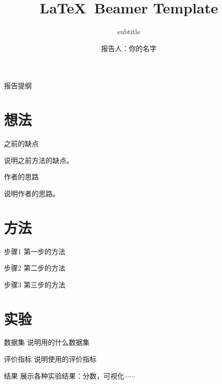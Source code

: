 \documentclass[11pt, aspectratio=169, UTF8, fontset=none]{ctexbeamer}
\title[\LaTeX \ Beamer Template]{\LaTeX \ Beamer Template}
\subtitle{subtitle}
\author[你的名字]{报告人：你的名字}
\institute[你的实验室或学院]{你的大学}
\date{}
\begin{document}
\begin{frame}
    \titlepage
\end{frame}

\begin{frame}{报告提纲}
  \tableofcontents
\end{frame}

\section{想法}

\begin{frame}{之前的缺点}
    
    说明之前方法的缺点。

\end{frame}

\begin{frame}{作者的思路}
    
    说明作者的思路。

\end{frame}

\section{方法}

\begin{frame}{步骤1}
    第一步的方法
\end{frame}

\begin{frame}{步骤2}
    第二步的方法
\end{frame}

\begin{frame}{步骤3}
    第三步的方法
\end{frame}

\section{实验}

\begin{frame}{数据集}
    说明用的什么数据集
\end{frame}

\begin{frame}{评价指标}
    说明使用的评价指标
\end{frame}

\begin{frame}{结果}
    展示各种实验结果：分数，可视化$\cdots\cdots$
\end{frame}
\end{document}
